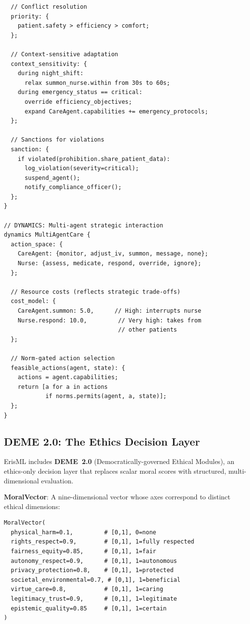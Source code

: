 \documentclass[conference]{IEEEtran}
\begin{document}
\begin{lstlisting}
  // Conflict resolution
  priority: {
    patient.safety > efficiency > comfort;
  };

  // Context-sensitive adaptation
  context_sensitivity: {
    during night_shift:
      relax summon_nurse.within from 30s to 60s;
    during emergency_status == critical:
      override efficiency_objectives;
      expand CareAgent.capabilities += emergency_protocols;
  };

  // Sanctions for violations
  sanction: {
    if violated(prohibition.share_patient_data):
      log_violation(severity=critical);
      suspend_agent();
      notify_compliance_officer();
  };
}

// DYNAMICS: Multi-agent strategic interaction
dynamics MultiAgentCare {
  action_space: {
    CareAgent: {monitor, adjust_iv, summon, message, none};
    Nurse: {assess, medicate, respond, override, ignore};
  };

  // Resource costs (reflects strategic trade-offs)
  cost_model: {
    CareAgent.summon: 5.0,      // High: interrupts nurse
    Nurse.respond: 10.0,         // Very high: takes from
                                 // other patients
  };

  // Norm-gated action selection
  feasible_actions(agent, state): {
    actions = agent.capabilities;
    return [a for a in actions
            if norms.permits(agent, a, state)];
  };
}
\end{lstlisting}

\subsection{DEME 2.0: The Ethics Decision Layer}

ErisML includes \textbf{DEME~2.0} (Democratically-governed Ethical Modules), an ethics-only decision layer that replaces scalar moral scores with structured, multi-dimensional evaluation.

\textbf{MoralVector}: A nine-dimensional vector whose axes correspond to distinct ethical dimensions:

\begin{lstlisting}
MoralVector(
  physical_harm=0.1,         # [0,1], 0=none
  rights_respect=0.9,        # [0,1], 1=fully respected
  fairness_equity=0.85,      # [0,1], 1=fair
  autonomy_respect=0.9,      # [0,1], 1=autonomous
  privacy_protection=0.8,    # [0,1], 1=protected
  societal_environmental=0.7, # [0,1], 1=beneficial
  virtue_care=0.8,           # [0,1], 1=caring
  legitimacy_trust=0.9,      # [0,1], 1=legitimate
  epistemic_quality=0.85     # [0,1], 1=certain
)
\end{lstlisting}
\end{document}

